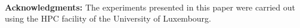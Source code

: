 \documentclass{llncs}
\begin{document}
~\\
{\noindent \textbf{Acknowledgments:}}
The experiments presented in this paper were carried
out using the HPC facility of the University of Luxembourg.
%
% 

%



\appendix


\end{document}
